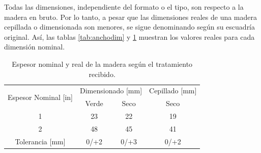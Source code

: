 Todas las dimensiones, independiente del formato o el tipo, son respecto a la madera en bruto. Por lo tanto, a pesar que las dimensiones reales de una madera cepillada o dimensionada son menores, se sigue denominando según su escuadría original. Así, las tablas \ref{tab:anchodim} y \ref{tab:espdim} muestran los valores reales para cada dimensión nominal.

\begin{table}[H]
\centering
\caption{Espesor nominal y real de la madera según el tratamiento recibido.}
\begin{tabular}{@{}cccc@{}}
\toprule
\multirow{2}{*}{Espesor Nominal {[}in{]}} & \multicolumn{2}{c}{Dimensionado {[}mm{]}} & Cepillado {[}mm{]} \\ \cmidrule(l){2-4} 
                                  & Verde                & Seco               & Seco               \\ \midrule
1                                 & 23                   & 22                 & 19                 \\
2                                 & 48                   & 45                 & 41                 \\ \midrule
Tolerancia {[}mm{]}               & 0/+2                 & 0/+3               & 0/+2               \\ \bottomrule
\end{tabular}
\label{tab:espdim}
\end{table}

